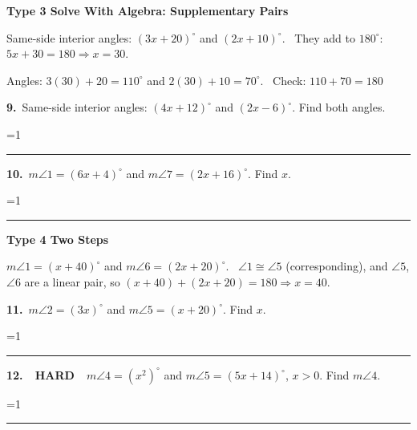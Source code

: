 \documentclass[11pt,letterpaper]{article}
\newcommand{\leveltag}[2]{\colorbox{#1}{\color{white}\bfseries\scriptsize\ #2\ }}
\newcommand{\LH}{\leveltag{fmmistake}{HARD}}
\newcommand{\topicbar}[1]{\needspace{4.5cm}\par\vspace{5mm}
  \begin{tcolorbox}[enhanced,colback=fmtitle,colframe=fmtitle,arc=2mm,left=4mm,top=1.5mm,bottom=1.5mm]
  \color{white}\bfseries\large #1
  \end{tcolorbox}}
\providecommand{\iskey}{0}
\newcommand{\pans}[2][3.2cm]{\ifnum\iskey=1 \underline{\makebox[#1][c]{\color{fmmistake}\bfseries #2}}\else\rule{#1}{0.4pt}\fi}
\newcommand{\algp}[3]{\begin{minipage}[t][4.6cm]{0.48\linewidth}{\color{fmturn}\bfseries #1.}\ #2\par\vfill\hfill \pans[4.2cm]{#3}\end{minipage}}
\newlength{\pw}
\renewcommand{\pans}[2][3.2cm]{\ifnum\iskey=1 \settowidth{\pw}{\bfseries #2}\ifdim\pw>#1 \parbox[b]{#1}{\raggedleft\color{fmmistake}\bfseries\small #2}\else\underline{\makebox[#1][c]{\color{fmmistake}\bfseries #2}}\fi\else\rule{#1}{0.4pt}\fi}
\begin{document}
\needspace{6cm}\topicbar{Type 3 \quad Solve With Algebra: Supplementary Pairs}
\begin{watchme}Same-side interior angles: $(3x + 20)^\circ$ and $(2x + 10)^\circ$. \ They add to $180^\circ$: $5x + 30 = 180 \Rightarrow x = 30$.\par
Angles: $3(30) + 20 = 110^\circ$ and $2(30) + 10 = 70^\circ$. \ Check: $110 + 70 = 180$ \end{watchme}
\needspace{4.6cm}\noindent\algp{9}{Same-side interior angles: $(4x + 12)^\circ$ and $(2x - 6)^\circ$. Find both angles.}{$x = 29$: $128^\circ$ and $52^\circ$}\hfill\algp{10}{$m\angle 1 = (6x + 4)^\circ$ and $m\angle 7 = (2x + 16)^\circ$. Find $x$.}{$x = 20$}\par

\needspace{6cm}\topicbar{Type 4 \quad Two Steps}
\begin{watchme}$m\angle 1 = (x + 40)^\circ$ and $m\angle 6 = (2x + 20)^\circ$. \ $\angle 1 \cong \angle 5$ (corresponding), and $\angle 5$, $\angle 6$ are a linear pair, so $(x + 40) + (2x + 20) = 180 \Rightarrow x = 40$.\end{watchme}
\needspace{4.6cm}\noindent\algp{11}{$m\angle 2 = (3x)^\circ$ and $m\angle 5 = (x + 20)^\circ$. Find $x$.}{$x = 40$}\hfill\algp{12}{\LH\ $m\angle 4 = (x^2)^\circ$ and $m\angle 5 = (5x + 14)^\circ$, $x > 0$. Find $m\angle 4$.}{$x = 7$, $49^\circ$}\par
\end{document}
